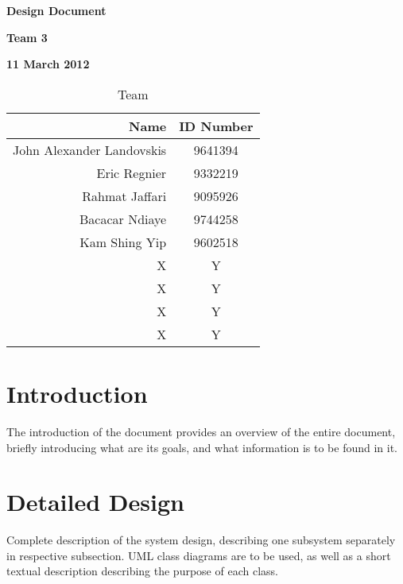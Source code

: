 \documentclass[12pt]{article}
\begin{document}
\vspace*{0.5in}
\centerline{\bf\Large Design Document}

\vspace*{0.5in}
\centerline{\bf\Large Team 3}

\vspace*{0.5in}
\centerline{\bf\Large 11 March 2012}

\vspace*{1.5in}
\begin{table}[htbp]
\caption{Team}
\begin{center}
\begin{tabular}{|r | c|}
\hline
Name & ID Number \\
\hline\hline
John Alexander Landovskis & 9641394\\
Eric Regnier & 9332219\\
Rahmat Jaffari & 9095926\\
Bacacar Ndiaye & 9744258\\
Kam Shing Yip & 9602518\\
X & Y\\
X & Y\\
X & Y\\
X & Y\\
\hline
\end{tabular}
\end{center}
\end{table}

\clearpage

\section{Introduction}

The introduction of the document provides an overview of the entire document,
briefly introducing what are its goals, and what information is to be found in it.



\section{Detailed Design} \label{sec:detail}

Complete description of the system design, describing one subsystem separately in respective subsection.
UML class diagrams are to be used, as well as a short textual description describing the purpose of each class.







\end{document}
